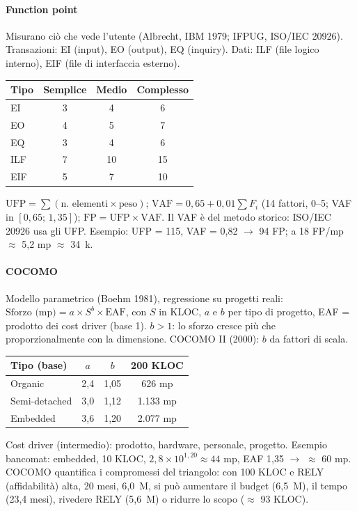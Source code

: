 \documentclass[12pt]{extarticle}
\begin{document}
\paragraph{Function point} Misurano ciò che vede l'utente (Albrecht, IBM 1979; IFPUG, ISO/IEC 20926). Transazioni: EI (input), EO (output), EQ (inquiry). Dati: ILF (file logico interno), EIF (file di interfaccia esterno).
\begin{center}
\small
\begin{tabular}{p{4.0cm}ccc}
    \toprule
    \textbf{Tipo} & \textbf{Semplice} & \textbf{Medio} & \textbf{Complesso} \\
    \midrule
    EI & 3 & 4 & 6 \\
    EO & 4 & 5 & 7 \\
    EQ & 3 & 4 & 6 \\
    ILF & 7 & 10 & 15 \\
    EIF & 5 & 7 & 10 \\
    \bottomrule
\end{tabular}
\end{center}
$\mathrm{UFP}=\sum(\text{n.\ elementi}\times\text{peso})$; $\mathrm{VAF}=0{,}65+0{,}01\sum F_i$ (14 fattori, 0--5; VAF in $[0{,}65;\,1{,}35]$); $\mathrm{FP}=\mathrm{UFP}\times\mathrm{VAF}$. Il VAF è del metodo storico: ISO/IEC 20926 usa gli UFP. Esempio: UFP = 115, VAF = 0,82 $\rightarrow$ 94 FP; a 18 FP/mp $\approx$ 5,2 mp $\approx$ 34~k\texteuro.

\paragraph{COCOMO} Modello parametrico (Boehm 1981), regressione su progetti reali: $\text{Sforzo (mp)}=a\times S^{b}\times\mathrm{EAF}$, con $S$ in KLOC, $a$ e $b$ per tipo di progetto, EAF = prodotto dei cost driver (base 1). $b>1$: lo sforzo cresce più che proporzionalmente con la dimensione. COCOMO II (2000): $b$ da fattori di scala.
\begin{center}
\small
\begin{tabular}{p{3.0cm}ccc}
    \toprule
    \textbf{Tipo (base)} & $a$ & $b$ & \textbf{200 KLOC} \\
    \midrule
    Organic & 2,4 & 1,05 & 626 mp \\
    Semi-detached & 3,0 & 1,12 & 1.133 mp \\
    Embedded & 3,6 & 1,20 & 2.077 mp \\
    \bottomrule
\end{tabular}
\end{center}
Cost driver (intermedio): prodotto, hardware, personale, progetto. Esempio bancomat: embedded, 10 KLOC, $2{,}8\times10^{1{,}20}\approx44$ mp, EAF 1,35 $\rightarrow$ $\approx$ 60 mp. COCOMO quantifica i compromessi del triangolo: con 100 KLOC e RELY (affidabilità) alta, 20 mesi, 6,0~M\texteuro, si può aumentare il budget (6,5~M\texteuro), il tempo (23,4 mesi), rivedere RELY (5,6~M\texteuro) o ridurre lo scopo ($\approx$ 93 KLOC).
\end{document}
